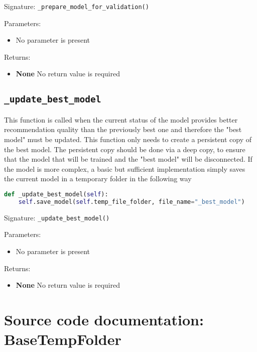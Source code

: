 Signature: \texttt{\_prepare\_model\_for\_validation()}

Parameters:
\begin{itemize}
    \item No parameter is present

\end{itemize}

Returns:
\begin{itemize}
    \item \textbf{None} No return value is required
\end{itemize}


\subsection{\texttt{\_update\_best\_model}}
This function is called when the current status of the model provides better recommendation quality than the previously best one and therefore the "best model" must be updated. This function only needs to create a persistent copy of the best model. 
The persistent copy should be done via a deep copy, to ensure that the model that will be trained and the "best model" will be disconnected. If the model is more complex, a basic but sufficient implementation simply saves the current model in a temporary folder in the following way
\begin{lstlisting}[language=Python]
def _update_best_model(self):
    self.save_model(self.temp_file_folder, file_name="_best_model")
\end{lstlisting}

Signature: \texttt{\_update\_best\_model()}

Parameters:
\begin{itemize}
    \item No parameter is present

\end{itemize}

Returns:
\begin{itemize}
    \item \textbf{None} No return value is required
\end{itemize}











\clearpage

\section{Source code documentation: BaseTempFolder}
\label{sec:source_documentation_BaseTempFolder}

